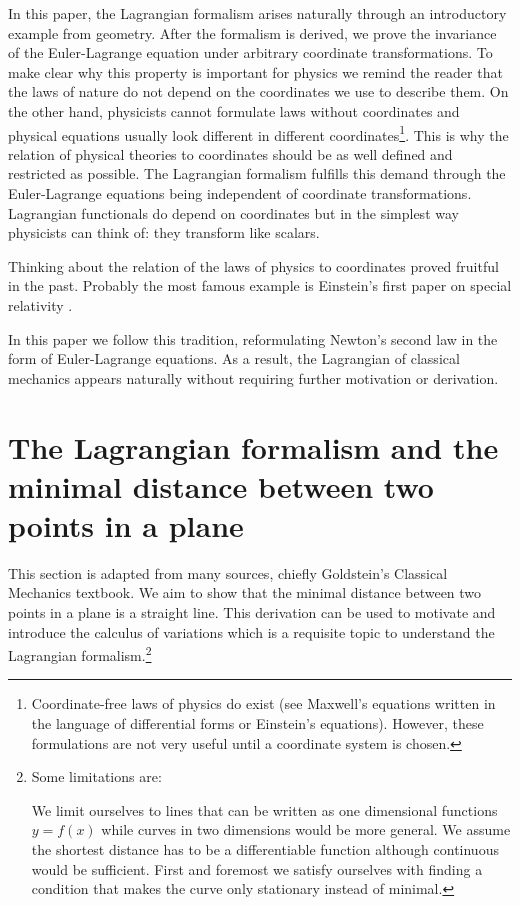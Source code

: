 \documentclass[prb,preprint]{revtex4-1}
\begin{document}
In this paper, the Lagrangian formalism arises naturally through an introductory example from geometry. After the formalism is derived, we prove the invariance of the Euler-Lagrange equation under arbitrary coordinate transformations. To make clear why this property is important for physics we remind the reader that the laws of nature do not depend on the coordinates we use to describe them. On the other hand, physicists cannot formulate laws without coordinates and physical equations usually look different in different coordinates\footnote{Coordinate-free laws of physics do exist (see Maxwell's equations written in the language of differential forms or Einstein's equations). However, these formulations are not very useful until a coordinate system is chosen.}. This is why the relation of physical theories to coordinates should be as well defined and restricted as possible. The Lagrangian formalism fulfills this demand through the Euler-Lagrange equations being independent of coordinate transformations. Lagrangian functionals do depend on coordinates but in the simplest way physicists can think of: they transform like scalars.

Thinking about the relation of the laws of physics to coordinates proved fruitful in the past.
Probably the most famous example is Einstein's first paper on special relativity \cite{EinsteinSpecialRelativity}.

In this paper we follow this tradition, reformulating Newton's second law in the form of Euler-Lagrange equations. As a result, the Lagrangian of classical mechanics appears naturally without requiring further motivation or derivation. 


\section{The Lagrangian formalism and the minimal distance between two points in a plane}\label{distance}

This section is adapted from many sources, chiefly Goldstein's Classical Mechanics textbook\cite{goldstein2002classical}. We aim to show that the minimal distance between two points in a plane is a straight line. This derivation can be used to motivate and introduce the calculus of variations which is a requisite topic to understand the Lagrangian formalism.\footnote{Some limitations are:

We limit ourselves to lines that can be written as one dimensional functions $y=f(x)$ while curves in two dimensions would be more general. We assume the shortest distance has to be a differentiable function although continuous would be sufficient. First and foremost we satisfy ourselves with finding a condition that makes the curve only stationary instead of minimal.}
\end{document}
